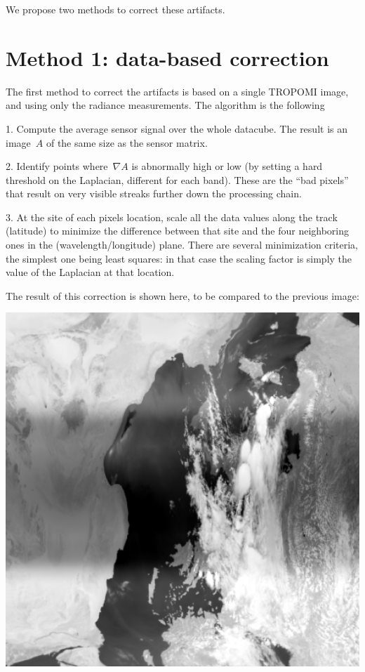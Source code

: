 \documentclass[a4paper]{article}    %
\theoremstyle{note}
\theoremstyle{plain}
\begin{document}
We propose two methods to correct these artifacts.

\clearpage
\section{Method 1: data-based correction}

The first method to correct the artifacts is based on a single TROPOMI image,
and using only the radiance measurements.  The algorithm is the following

1. Compute the average sensor signal over the whole datacube.  The result is
an image~$A$ of the same size as the sensor matrix.

2. Identify points where~$\nabla A$ is abnormally high or low (by setting a
hard threshold on the Laplacian, different for each band).  These are the
``bad pixels'' that result on very visible streaks further down the
processing chain.

3. At the site of each pixels location, scale all the data values along the
track (latitude) to minimize the difference between that site and the
four neighboring ones in the (wavelength/longitude) plane.  There are several
minimization criteria, the simplest one being least squares: in that case the
scaling factor is simply the value of the Laplacian at that location.

The result of this correction is shown here, to be compared to the previous
image:

\includegraphics[width=0.8\linewidth]{f/corrected_r6_288_log.png}
\end{document}
